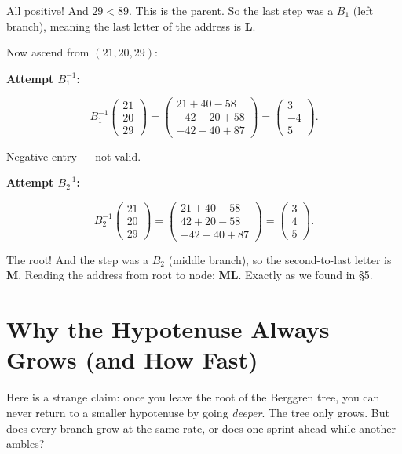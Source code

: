 \documentclass[11pt,twoside,openright]{book}
\theoremstyle{definition}
\theoremstyle{remark}
\begin{document}
All positive! And $29 < 89$. This is the parent. So the last step was a $B_1$ (left branch), meaning the last letter of the address is \textbf{L}.

Now ascend from $(21, 20, 29)$:

\textbf{Attempt $B_1^{-1}$:}

\[B_1^{-1} \begin{pmatrix} 21 \\ 20 \\ 29 \end{pmatrix} = \begin{pmatrix} 21 + 40 - 58 \\ -42 - 20 + 58 \\ -42 - 40 + 87 \end{pmatrix} = \begin{pmatrix} 3 \\ -4 \\ 5 \end{pmatrix}.\]

Negative entry --- not valid.

\textbf{Attempt $B_2^{-1}$:}

\[B_2^{-1} \begin{pmatrix} 21 \\ 20 \\ 29 \end{pmatrix} = \begin{pmatrix} 21 + 40 - 58 \\ 42 + 20 - 58 \\ -42 - 40 + 87 \end{pmatrix} = \begin{pmatrix} 3 \\ 4 \\ 5 \end{pmatrix}.\]

The root! And the step was a $B_2$ (middle branch), so the second-to-last letter is \textbf{M}. Reading the address from root to node: \textbf{ML}. Exactly as we found in §5.




\section{Why the Hypotenuse Always Grows (and How Fast)}

Here is a strange claim: once you leave the root of the Berggren tree, you can never return to a smaller hypotenuse by going \textit{deeper}. The tree only grows. But does every branch grow at the same rate, or does one sprint ahead while another ambles?
\end{document}

